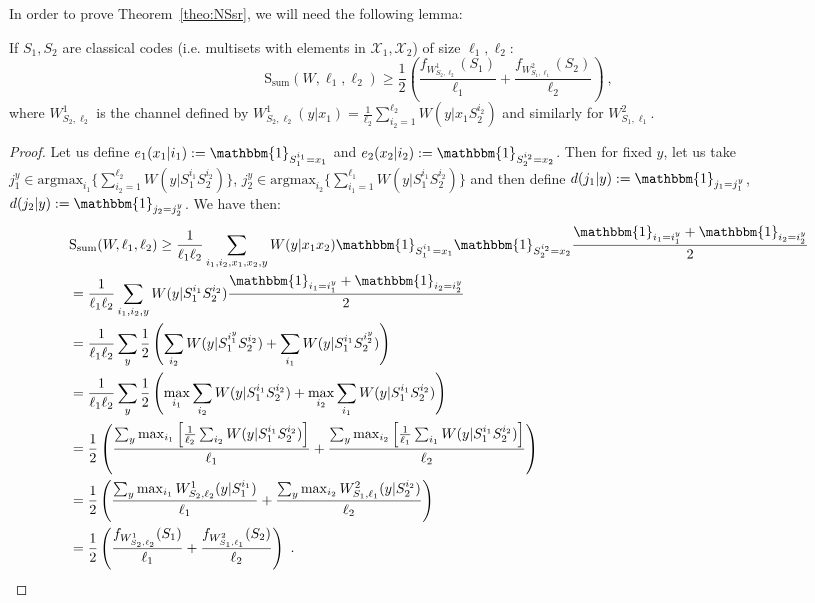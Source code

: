 In order to prove Theorem~\ref{theo:NSsr}, we will need the following lemma:

\begin{lemma}
  \label{lem:DoubleOneWay}
  If $S_1,S_2$ are classical codes (i.e. multisets with elements in $\mathcal{X}_1,\mathcal{X}_2$) of size $\ell_1,\ell_2$:
  \[ \mathrm{S}_{\text{sum}}(W,\ell_1,\ell_2) \geq \frac{1}{2}\left(\frac{f_{W^1_{S_2,\ell_2}}(S_1)}{\ell_1} + \frac{f_{W^2_{S_1,\ell_1}}(S_2)}{\ell_2}\right) \ ,\]
  where $W^1_{S_2, \ell_2}$ is the channel defined by $W^1_{S_2, \ell_2}(y|x_1) = \frac{1}{\ell_2} \sum_{i_2 = 1}^{\ell_2} W(y|x_1S_2^{i_2})$ and similarly for $W^2_{S_1, \ell_1}$.
\end{lemma}
\begin{proof}
  Let us define $e_1(x_1|i_1) := \mathbbm{1}_{S_1^{i_1}=x_1}$ and $e_2(x_2|i_2) := \mathbbm{1}_{S_2^{i_2}=x_2}$. Then for fixed $y$, let us take $j_1^y \in \text{argmax}_{i_1} \{\sum_{i_2 = 1}^{\ell_2}W(y|S_1^{i_1}S_2^{i_2})\}$, $j_2^y \in \text{argmax}_{i_2}\{\sum_{i_1 = 1}^{\ell_1}W(y|S_1^{i_1}S_2^{i_2})\}$ and then define $d(j_1|y) := \mathbbm{1}_{j_1=j_1^y}$, $d(j_2|y) := \mathbbm{1}_{j_2=j_2^y}$. We have then:
  \begin{equation}
    \begin{aligned}
      &\mathrm{S}_{\text{sum}}(W,\ell_1,\ell_2) \geq \frac{1}{\ell_1\ell_2}\sum_{i_1,i_2,x_1,x_2,y}W(y|x_1x_2)\mathbbm{1}_{S_1^{i_1}=x_1}\mathbbm{1}_{S_2^{i_2}=x_2}\frac{\mathbbm{1}_{i_1=i_1^y}+\mathbbm{1}_{i_2=i_2^y}}{2}\\
      &= \frac{1}{\ell_1\ell_2}\sum_{i_1,i_2,y}W(y|S_1^{i_1}S_2^{i_2})\frac{\mathbbm{1}_{i_1=i_1^y}+\mathbbm{1}_{i_2=i_2^y}}{2}\\
      &= \frac{1}{\ell_1\ell_2}\sum_{y}\frac{1}{2}\left(\sum_{i_2}W(y|S_1^{i_1^y}S_2^{i_2}) + \sum_{i_1}W(y|S_1^{i_1}S_2^{i_2^y})\right)\\
      &= \frac{1}{\ell_1\ell_2}\sum_{y}\frac{1}{2}\left(\max_{i_1}\sum_{i_2}W(y|S_1^{i_1}S_2^{i_2}) + \max_{i_2}\sum_{i_1}W(y|S_1^{i_1}S_2^{i_2})\right)\\
      &= \frac{1}{2}\left(\frac{\sum_{y}\max_{i_1}\left[\frac{1}{\ell_2}\sum_{i_2} W(y|S_1^{i_1}S_2^{i_2})\right]}{\ell_1} + \frac{\sum_{y}\max_{i_2}\left[\frac{1}{\ell_1}\sum_{i_1} W(y|S_1^{i_1}S_2^{i_2})\right]}{\ell_2} \right)\\
      &= \frac{1}{2}\left(\frac{\sum_{y}\max_{i_1}W^1_{S_2,\ell_2}(y|S_1^{i_1})}{\ell_1} + \frac{\sum_{y}\max_{i_2}W^2_{S_1,\ell_1}(y|S_2^{i_2})}{\ell_2} \right)\\
      &= \frac{1}{2}\left(\frac{f_{W^1_{S_2,\ell_2}}(S_1)}{\ell_1} + \frac{f_{W^2_{S_1,\ell_1}}(S_2)}{\ell_2}\right) \ .
    \end{aligned}
  \end{equation}
\end{proof}

